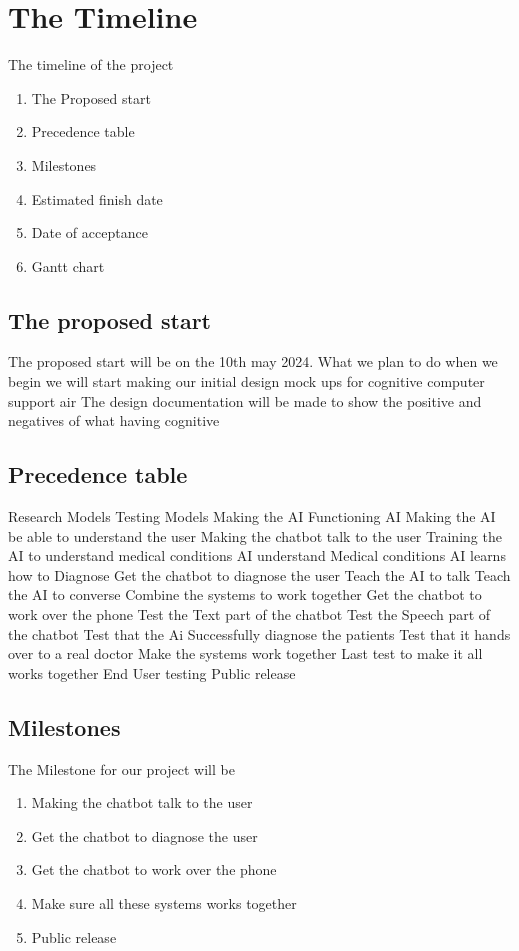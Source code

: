 \documentclass{article}
\begin{document}
\section{The Timeline}
The timeline of the project
\begin{enumerate}
	\item The Proposed start
	\item Precedence table
	\item Milestones
	\item Estimated finish date
	\item Date of acceptance 
	\item Gantt chart
\end{enumerate}

\subsection{The proposed start}
The proposed start will be on the 10th may 2024. What we plan to do when we begin we will start making our initial design mock ups for cognitive computer support air
The design documentation will be made to show the positive and negatives of what having cognitive 

\subsection{Precedence table}
Research Models
Testing Models
Making the AI
Functioning AI
Making the AI be able to understand the user
Making the chatbot talk to the user
Training the AI to understand medical conditions
AI understand Medical conditions
AI learns how to Diagnose
Get the chatbot to diagnose the user
Teach the AI to talk
Teach the AI to converse
Combine the systems to work together 
Get the chatbot to work over the phone
Test the Text part of the chatbot
Test the Speech part of the chatbot
Test that the Ai Successfully diagnose the patients
Test that it hands over to a real doctor
Make the systems work together
Last test to make it all works together
End User testing
Public release 


\subsection{Milestones}
The Milestone for our project will be 
	\begin{enumerate}
		\item Making the chatbot talk to the user
		\item Get the chatbot to diagnose the user
		\item Get the chatbot to work over the phone
		\item Make sure all these systems works together
		\item Public release
	\end{enumerate}
\end{document}
